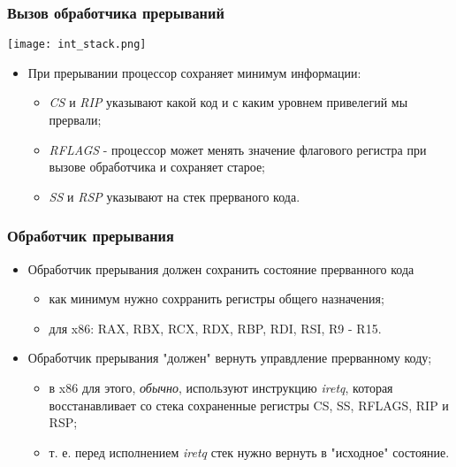 \begin{frame}
\frametitle{Вызов обработчика прерываний}
\begin{center}
  \texttt{[image: int\_stack.png]}
\end{center}
\begin{itemize}
  \item При прерывании процессор сохраняет минимум информации:
  \begin{itemize}
    \item \emph{CS} и \emph{RIP} указывают какой код и с каким уровнем
    привелегий мы прервали;
    \item \emph{RFLAGS} - процессор может менять значение флагового регистра при
    вызове обработчика и сохраняет старое;
    \item \emph{SS} и \emph{RSP} указывают на стек прерваного кода.
  \end{itemize}
\end{itemize}
\end{frame}

\begin{frame}
\frametitle{Обработчик прерывания}
\begin{itemize}
  \item Обработчик прерывания должен сохранить состояние прерванного кода
  \begin{itemize}
    \item как минимум нужно сохрранить регистры общего назначения;
    \item для x86: RAX, RBX, RCX, RDX, RBP, RDI, RSI, R9 - R15.
  \end{itemize}
  \item Обработчик прерывания "должен" вернуть управдление прерванному коду;
  \begin{itemize}
    \item в x86 для этого, \emph{обычно}, используют инструкцию \emph{iretq},
    которая восстанавливает со стека сохраненные регистры CS, SS, RFLAGS, RIP и
    RSP;
    \item т. е. перед исполнением \emph{iretq} стек нужно вернуть в "исходное"
    состояние.
  \end{itemize}
\end{itemize}
\end{frame}

